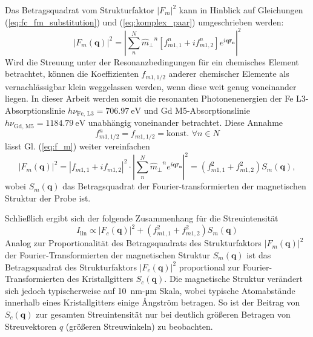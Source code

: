 \noindent
Das Betragsquadrat vom Strukturfaktor $\left|F_m\right|^2$ kann in Hinblick auf Gleichungen (\ref{eq:fc_fm_substitution}) und (\ref{eq:komplex_paar}) umgeschrieben werden:
\begin{equation}
    \left|F_m(\mathbf{q})\right|^2 =  \left|\sum^N_n {\hat{m}_\perp}^n \left[f_{m1,1}^n + if_{m1,2}^n\right] e^{i\mathbf{qr_n}}\right|^2
    \label{eq:f_m}
\end{equation}
Wird die Streuung unter der Resonanzbedingungen für ein chemisches Element betrachtet, können die Koeffizienten $f_{m1,1/2}$ anderer chemischer Elemente als vernachlässigbar klein weggelassen werden, wenn diese weit genug voneinander liegen. In dieser Arbeit werden somit die resonanten Photonenenergien der Fe L3-Absorptionslinie $h\nu_{\text{Fe, L3}} = \SI{706.97}{\eV}$ und Gd M5-Absorptionslinie $h\nu_{\text{Gd, M5}} = \SI{1184.79}{\eV}$ unabhängig voneinander betrachtet. Diese Annahme
\begin{equation}
    f_{m1,1/2}^n = f_{m1,1/2} = \text{konst. } \forall n \in N
\end{equation}
lässt Gl. (\ref{eq:f_m}) weiter vereinfachen
\begin{equation}
   \left|F_m(\mathbf{q})\right|^2 = \left|f_{m1,1} + if_{m1,2}\right|^2 \cdot \left|\sum^N_n {\hat{m}_\perp}^n e^{i\mathbf{qr_n}}\right|^2 = \left(f_{m1,1}^2 + f_{m1,2}^2\right)S_m(\mathbf{q}),
\end{equation}
wobei $S_m(\mathbf{q})$ das Betragsquadrat der Fourier-transformierten der magnetischen Struktur der Probe ist.

\noindent
Schließlich ergibt sich der folgende Zusammenhang für die Streuintensität 
\begin{equation}
    I_{\text{lin}} \propto  \left| F_c(\mathbf{q}) \right|^2 + \left(f_{m1,1}^2 + f_{m1,2}^2\right)S_m(\mathbf{q})
    \label{eq:intensitat_fourier}
\end{equation}
\noindent
Analog zur Proportionalität des Betragsquadrats des Strukturfaktors $\left|F_m(\mathbf{q})\right|^2$ der Fourier-Trans\-for\-mier\-ten der magnetischen Struktur $S_m(\mathbf{q})$ ist das Betragsquadrat des Strukturfaktors $\left|F_c(\mathbf{q})\right|^2$ proportional zur Fourier-Transformierten des Kristallgitters $S_c(\mathbf{q})$. Die magnetische Struktur verändert sich jedoch typischerweise auf \SI{10}{\nano\meter}-\si{\micro\meter} Skala, wobei typische Atomabstände innerhalb eines Kristallgitters einige Ångström betragen. So ist der Beitrag von $S_c(\mathbf{q})$ zur gesamten Streuintensität nur bei deutlich größeren Betragen von Streuvektoren $q$ (größeren Streuwinkeln) zu beobachten.%

